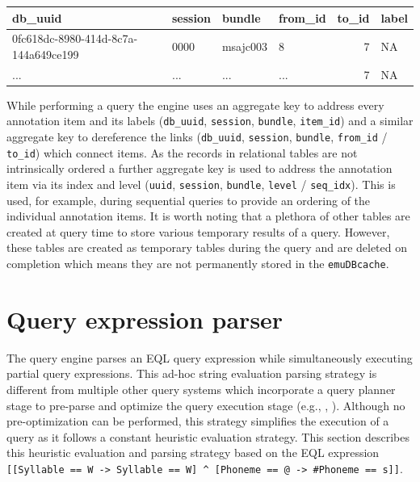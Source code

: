 \documentclass[]{book}
\theoremstyle{definition}
\theoremstyle{definition}
\theoremstyle{definition}
\theoremstyle{remark}
\begin{document}
\begin{tabular}{l|l|l|l|r|l}
\hline
db\_uuid & session & bundle & from\_id & to\_id & label\\
\hline
0fc618dc-8980-414d-8c7a-144a649ce199 & 0000 & msajc003 & 8 & 7 & NA\\
\hline
... & ... & ... & ... & 7 & NA\\
\hline
\end{tabular}

While performing a query the engine uses an aggregate key to address
every annotation item and its labels (\texttt{db\_uuid},
\texttt{session}, \texttt{bundle}, \texttt{item\_id}) and a similar
aggregate key to dereference the links (\texttt{db\_uuid},
\texttt{session}, \texttt{bundle}, \texttt{from\_id} / \texttt{to\_id})
which connect items. As the records in relational tables are not
intrinsically ordered a further aggregate key is used to address the
annotation item via its index and level (\texttt{uuid},
\texttt{session}, \texttt{bundle}, \texttt{level} / \texttt{seq\_idx}).
This is used, for example, during sequential queries to provide an
ordering of the individual annotation items. It is worth noting that a
plethora of other tables are created at query time to store various
temporary results of a query. However, these tables are created as
temporary tables during the query and are deleted on completion which
means they are not permanently stored in the \texttt{emuDBcache}.

\hypertarget{sec:query-queryExpressionParser}{%
\section{Query expression
parser}\label{sec:query-queryExpressionParser}}

The query engine parses an EQL query expression while simultaneously
executing partial query expressions. This ad-hoc string evaluation
parsing strategy is different from multiple other query systems which
incorporate a query planner stage to pre-parse and optimize the query
execution stage (e.g., \citet{hipp:2007a}, \citet{conway:2016a}).
Although no pre-optimization can be performed, this strategy simplifies
the execution of a query as it follows a constant heuristic evaluation
strategy. This section describes this heuristic evaluation and parsing
strategy based on the EQL expression
\texttt{{[}{[}Syllable\ ==\ W\ -\textgreater{}\ Syllable\ ==\ W{]}\ \^{}\ {[}Phoneme\ ==\ @\ -\textgreater{}\ \#Phoneme\ ==\ s{]}{]}}.
\end{document}
